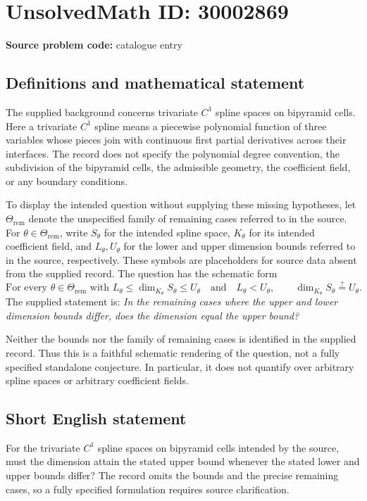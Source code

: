 \documentclass[11pt]{article}
\begin{document}
\section*{UnsolvedMath ID: 30002869}
\textbf{Source problem code:} catalogue entry
\subsection{Definitions and mathematical statement}
The supplied background concerns trivariate \(C^1\) spline spaces on bipyramid cells. Here a trivariate \(C^1\) spline means a piecewise polynomial function of three variables whose pieces join with continuous first partial derivatives across their interfaces. The record does not specify the polynomial degree convention, the subdivision of the bipyramid cells, the admissible geometry, the coefficient field, or any boundary conditions.

To display the intended question without supplying these missing hypotheses, let \(\Theta_{\mathrm{rem}}\) denote the unspecified family of remaining cases referred to in the source. For \(\theta\in\Theta_{\mathrm{rem}}\), write \(S_\theta\) for the intended spline space, \(K_\theta\) for its intended coefficient field, and \(L_\theta,U_\theta\) for the lower and upper dimension bounds referred to in the source, respectively. These symbols are placeholders for source data absent from the supplied record. The question has the schematic form
\[
\text{For every }\theta\in\Theta_{\mathrm{rem}}\text{ with }
L_\theta\leq\dim_{K_\theta}S_\theta\leq U_\theta
\quad\text{and}\quad L_\theta<U_\theta,
\qquad
\dim_{K_\theta}S_\theta\stackrel{?}{=}U_\theta.
\]
The supplied statement is: \emph{In the remaining cases where the upper and lower dimension bounds differ, does the dimension equal the upper bound?}

Neither the bounds nor the family of remaining cases is identified in the supplied record. Thus this is a faithful schematic rendering of the question, not a fully specified standalone conjecture. In particular, it does not quantify over arbitrary spline spaces or arbitrary coefficient fields.
\subsection{Short English statement}
For the trivariate \(C^1\) spline spaces on bipyramid cells intended by the source, must the dimension attain the stated upper bound whenever the stated lower and upper bounds differ? The record omits the bounds and the precise remaining cases, so a fully specified formulation requires source clarification.
\end{document}
